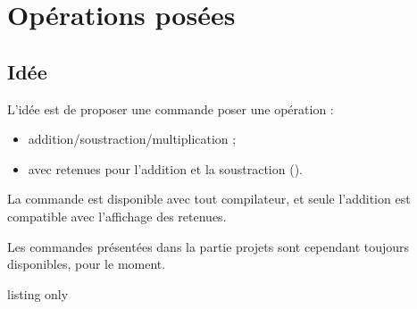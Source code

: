 \begin{PresCodePL}{}
\end{PresCodePL}

\begin{PresCodePL}{}
\end{PresCodePL}

\newpage

\section{Opérations posées}\label{opeposees}

\subsection{Idée}

\begin{tipblock}
 L'idée est de proposer une commande poser une opération :

\begin{itemize}
	\item addition/soustraction/multiplication ;
	\item avec retenues pour l'addition et la soustraction ().
\end{itemize}
\vspace*{-\baselineskip}\leavevmode
\end{tipblock}

\begin{cautionblock}
La commande est disponible avec tout compilateur, et seule l'addition est compatible avec l'affichage des retenues.

\smallskip

Les commandes présentées dans la partie \textsf{projets} sont cependant toujours disponibles, pour le moment.
\end{cautionblock}

\begin{PresCodeTexPL}{listing only}
\end{PresCodeTexPL}

\begin{PresCodePL}{}
\end{PresCodePL}

\begin{PresCodePL}{}
\end{PresCodePL}

